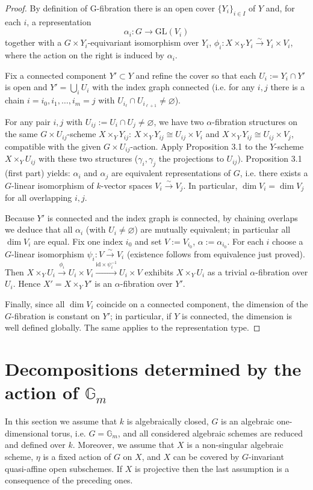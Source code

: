 \documentclass[12pt]{article}
\begin{document}
\begin{proof}
   By definition of G-fibration there is an open cover $\{Y_i\}_{i\in I}$ of $Y$ and, for each $i$, a representation 
   \[\alpha_i: G \longrightarrow \mathrm{GL}(V_i)\]
   together with a $G\times Y_i$-equivariant isomorphism over $Y_i$,
   $\phi_i: X\times_Y Y_i \xrightarrow{\sim} Y_i\times V_i$,
   where the action on the right is induced by $\alpha_i$.

   Fix a connected component $Y'\subset Y$ and refine the cover so that each $U_i:=Y_i\cap Y'$ is open and $Y'=\bigcup_i U_i$ with the index graph connected (i.e. for any $i,j$ there is a chain $i=i_0,i_1,\dots,i_m=j$ with $U_{i_\ell}\cap U_{i_{\ell+1}}\neq\varnothing$).

   For any pair $i,j$ with $U_{ij}:=U_i\cap U_j\neq\varnothing$, we have two $\alpha$-fibration structures on the same $G\times U_{ij}$-scheme $X\times_YY_{ij}$:
   $X\times_YY_{ij}\cong U_{ij}\times V_i$
   and
   $X\times_YY_{ij}\cong U_{ij}\times V_j$,
   compatible with the given $G\times U_{ij}$-action. Apply Proposition 3.1 to the $Y$-scheme $X\times_YU_{ij}$ with these two structures ($\gamma_i,\gamma_j$ the projections to $U_{ij}$). Proposition 3.1 (first part) yields:
   $\alpha_i$ and $\alpha_j$ are equivalent representations of $G$,
   i.e. there exists a $G$-linear isomorphism of $k$-vector spaces $V_i \xrightarrow{\sim} V_j$. In particular,
   $\dim V_i = \dim V_j$ for all overlapping $i,j$.

   Because $Y'$ is connected and the index graph is connected, by chaining overlaps we deduce that all $\alpha_i$ (with $U_i\neq\varnothing$) are mutually equivalent; in particular all $\dim V_i$ are equal. Fix one index $i_0$ and set
   $V := V_{i_0}$, $\alpha := \alpha_{i_0}$.
   For each $i$ choose a $G$-linear isomorphism $\psi_i: V \xrightarrow{\sim} V_i$ (existence follows from equivalence just proved). Then
   $X\times_Y U_i \xrightarrow{\phi_i} U_i\times V_i
   \xrightarrow{\mathrm{id}\times \psi_i^{-1}} U_i\times V$
   exhibits $X\times_Y U_i$ as a trivial $\alpha$-fibration over $U_i$. Hence $X' = X\times_Y Y'$ is an $\alpha$-fibration over $Y'$.

   Finally, since all $\dim V_i$ coincide on a connected component, the dimension of the $G$-fibration is constant on $Y'$; in particular, if $Y$ is connected, the dimension is well defined globally. The same applies to the representation type.
   \end{proof}

   \section{Decompositions determined by the action of $\mathbb{G}_m$}
In this section we assume that $k$ is algebraically closed, $G$ is an algebraic one-dimensional torus, i.e. $G = \mathbb{G}_m$, and all considered algebraic schemes are reduced and defined over $k$. Moreover, we assume that $X$ is a non-singular algebraic scheme, $\eta$ is a fixed action of $G$ on $X$, and $X$ can be covered by $G$-invariant quasi-affine open subschemes. If $X$ is projective then the last assumption is a consequence of the preceding ones.
\end{document}
